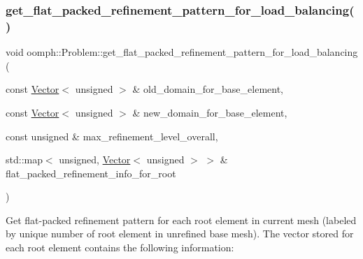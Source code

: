 \subsubsection{\texorpdfstring{get\+\_\+flat\+\_\+packed\+\_\+refinement\+\_\+pattern\+\_\+for\+\_\+load\+\_\+balancing()}{get\_flat\_packed\_refinement\_pattern\_for\_load\_balancing()}}
{\footnotesize\ttfamily void oomph\+::\+Problem\+::get\+\_\+flat\+\_\+packed\+\_\+refinement\+\_\+pattern\+\_\+for\+\_\+load\+\_\+balancing (\begin{DoxyParamCaption}\item[{const \hyperlink{classoomph_1_1Vector}{Vector}$<$ unsigned $>$ \&}]{old\+\_\+domain\+\_\+for\+\_\+base\+\_\+element,  }\item[{const \hyperlink{classoomph_1_1Vector}{Vector}$<$ unsigned $>$ \&}]{new\+\_\+domain\+\_\+for\+\_\+base\+\_\+element,  }\item[{const unsigned \&}]{max\+\_\+refinement\+\_\+level\+\_\+overall,  }\item[{std\+::map$<$ unsigned, \hyperlink{classoomph_1_1Vector}{Vector}$<$ unsigned $>$ $>$ \&}]{flat\+\_\+packed\+\_\+refinement\+\_\+info\+\_\+for\+\_\+root }\end{DoxyParamCaption})\hspace{0.3cm}{\ttfamily [private]}}



Get flat-\/packed refinement pattern for each root element in current mesh (labeled by unique number of root element in unrefined base mesh). The vector stored for each root element contains the following information\+: 


